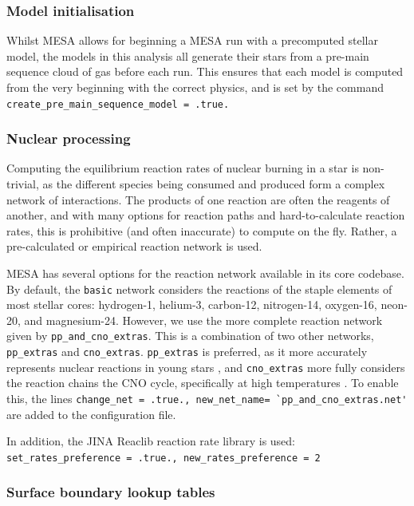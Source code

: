 \subsubsection{Model initialisation}

Whilst MESA allows for beginning a MESA run with a precomputed stellar model, the models in this analysis all generate their stars from a pre-main sequence cloud of gas before each run. This ensures that each model is computed from the very beginning with the correct physics, and is set by the command \lstinline{create_pre_main_sequence_model = .true.}


\subsubsection{Nuclear processing}

Computing the equilibrium reaction rates of nuclear burning in a star is non-trivial, as the different species being consumed and produced form a complex network of interactions.
The products of one reaction are often the reagents of another, and with many options for reaction paths and hard-to-calculate reaction rates, this is prohibitive (and often inaccurate) to compute on the fly. Rather, a pre-calculated or empirical reaction network is used.

MESA has several options for the reaction network available in its core codebase. By default, the \lstinline{basic} network considers the reactions of the staple elements of most stellar cores: hydrogen-1, helium-3, carbon-12, nitrogen-14, oxygen-16, neon-20, and magnesium-24.
However, we use the more complete reaction network given by \lstinline{pp_and_cno_extras}. This is a combination of two other networks, \lstinline{pp_extras} and \lstinline{cno_extras}.
\lstinline{pp_extras} is preferred, as it more accurately represents nuclear reactions in young stars \citep{murphy2021}, and \lstinline{cno_extras} more fully considers the reaction chains the CNO cycle, specifically at high temperatures \citep{paxton2011}. To enable this, the lines \lstinline{change_net = .true., new_net_name= `pp_and_cno_extras.net'} are added to the configuration file.

In addition, the JINA Reaclib reaction rate library \citep{cyburt2010} is used: \lstinline{set_rates_preference = .true., new_rates_preference = 2}


\subsubsection{Surface boundary lookup tables}
\label{sect:modelling:MESA surface boundary tables}

